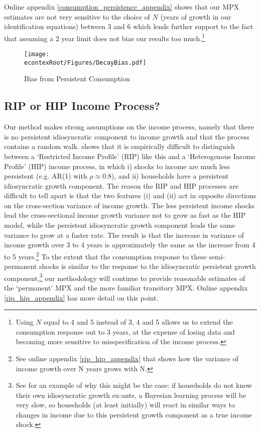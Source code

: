 \documentclass[titlepage]{\econtex}\newcommand{\texname}{ConsumptionHeterogeneity}
\begin{document}
Online appendix \ref{consumption_persistence_appendix} shows that our MPX estimates are not very sensitive to the choice of $N$ (years of growth in our identification equations) between 3 and 6 which lends further support to the fact that assuming a 2 year limit does not bias our results too much.\footnote{Using $N$ equal to 4 and 5 instead of 3, 4 and 5 allows us to extend the consumption response out to 3 years, at the expense of losing data and becoming more sensitive to misspecification of the income process.}
\begin{figure} 
	\begin{centering}
		\texttt{[image: \\econtexRoot/Figures/DecayBias.pdf]}
		\caption{Bias from Persistent Consumption}
		\label{fig:DecayBias}
	\end{centering}
\end{figure}

\subsection{RIP or HIP Income Process?} \label{rip_hip}
Our method makes strong assumptions on the income process, namely that there is no persistent idiosyncratic component to income growth and that the process contains a random walk. \cite{guvenen_empirical_2009} shows that it is empirically difficult to distinguish between a `Restricted Income Profile' (RIP) like this and a `Heterogenous Income Profile' (HIP) income process, in which i) shocks to income are much less persistent (e.g. AR(1) with $\rho\approx 0.8$), and ii) households have a persistent idiosyncratic growth component. The reason the RIP and HIP processes are difficult to tell apart is that the two features (i) and (ii) act in opposite directions on the cross-section variance of income growth. The less persistent income shocks lead the cross-sectional income growth variance not to grow as fast as the HIP model, while the persistent idiosyncratic growth component leads the same variance to grow at a faster rate. The result is that the increase in variance of income growth over 3 to 4 years is approximately the same as the increase from 4 to 5 years.\footnote{See online appendix \ref{rip_hip_appendix} that shows how the variance of income growth over N years grows with N.} To the extent that the consumption response to these semi-permanent shocks is similar to the response to the idiosyncratic persistent growth component,\footnote{See \cite{guvenen_learning_2007} for an example of why this might be the case: if households do not know their own idiosyncratic growth ex-ante, a Bayesian learning process will be very slow, so households (at least initially) will react in similar ways to changes in income due to this persistent growth component as a true income shock.} our methodology will continue to provide reasonable estimates of the `permanent' MPX and the more familiar transitory MPX. Online appendix \ref{rip_hip_appendix} has more detail on this point.
\end{document}
